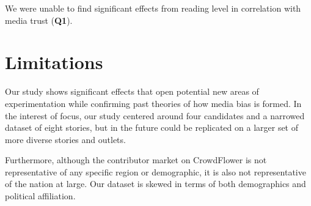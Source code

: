 We were unable to find significant effects from reading level in correlation with media trust (\textbf{Q1}).


\section{Limitations}

Our study shows significant effects that open potential new areas of experimentation while confirming past theories of how media bias is formed. In the interest of focus, our study centered around four candidates and a narrowed dataset of eight stories, but in the future could be replicated on a larger set of more diverse stories and outlets. 

Furthermore, although the contributor market on CrowdFlower is not representative of any specific region or demographic, it is also not representative of the nation at large. Our dataset is skewed in terms of both demographics and political affiliation.


